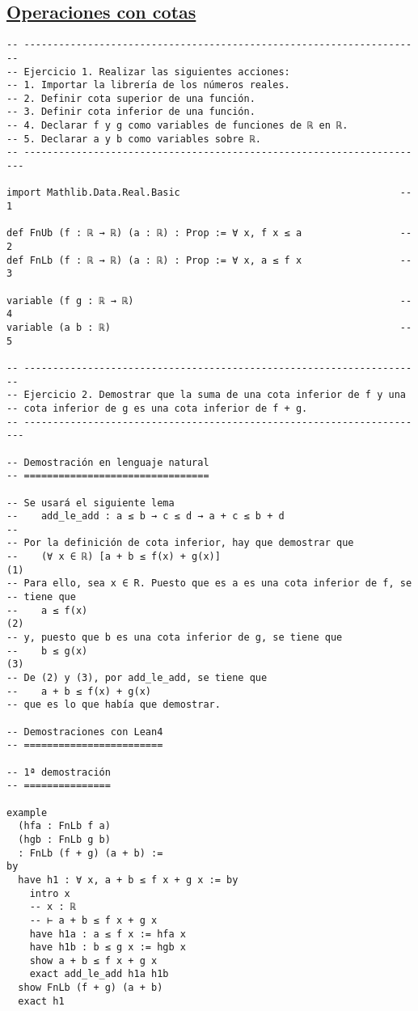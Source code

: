 \subsection{\href{./src/Logica/Operaciones\_con\_cotas.lean}{Operaciones con cotas}}
\label{sec:org4559288}
\begin{verbatim}
-- ---------------------------------------------------------------------
-- Ejercicio 1. Realizar las siguientes acciones:
-- 1. Importar la librería de los números reales.
-- 2. Definir cota superior de una función.
-- 3. Definir cota inferior de una función.
-- 4. Declarar f y g como variables de funciones de ℝ en ℝ.
-- 5. Declarar a y b como variables sobre ℝ.
-- ----------------------------------------------------------------------

import Mathlib.Data.Real.Basic                                      -- 1

def FnUb (f : ℝ → ℝ) (a : ℝ) : Prop := ∀ x, f x ≤ a                 -- 2
def FnLb (f : ℝ → ℝ) (a : ℝ) : Prop := ∀ x, a ≤ f x                 -- 3

variable (f g : ℝ → ℝ)                                              -- 4
variable (a b : ℝ)                                                  -- 5

-- ---------------------------------------------------------------------
-- Ejercicio 2. Demostrar que la suma de una cota inferior de f y una
-- cota inferior de g es una cota inferior de f + g.
-- ----------------------------------------------------------------------

-- Demostración en lenguaje natural
-- ================================

-- Se usará el siguiente lema
--    add_le_add : a ≤ b → c ≤ d → a + c ≤ b + d
--
-- Por la definición de cota inferior, hay que demostrar que
--    (∀ x ∈ ℝ) [a + b ≤ f(x) + g(x)]                                  (1)
-- Para ello, sea x ∈ R. Puesto que es a es una cota inferior de f, se
-- tiene que
--    a ≤ f(x)                                                         (2)
-- y, puesto que b es una cota inferior de g, se tiene que
--    b ≤ g(x)                                                         (3)
-- De (2) y (3), por add_le_add, se tiene que
--    a + b ≤ f(x) + g(x)
-- que es lo que había que demostrar.

-- Demostraciones con Lean4
-- ========================

-- 1ª demostración
-- ===============

example
  (hfa : FnLb f a)
  (hgb : FnLb g b)
  : FnLb (f + g) (a + b) :=
by
  have h1 : ∀ x, a + b ≤ f x + g x := by
    intro x
    -- x : ℝ
    -- ⊢ a + b ≤ f x + g x
    have h1a : a ≤ f x := hfa x
    have h1b : b ≤ g x := hgb x
    show a + b ≤ f x + g x
    exact add_le_add h1a h1b
  show FnLb (f + g) (a + b)
  exact h1


\end{verbatim}
